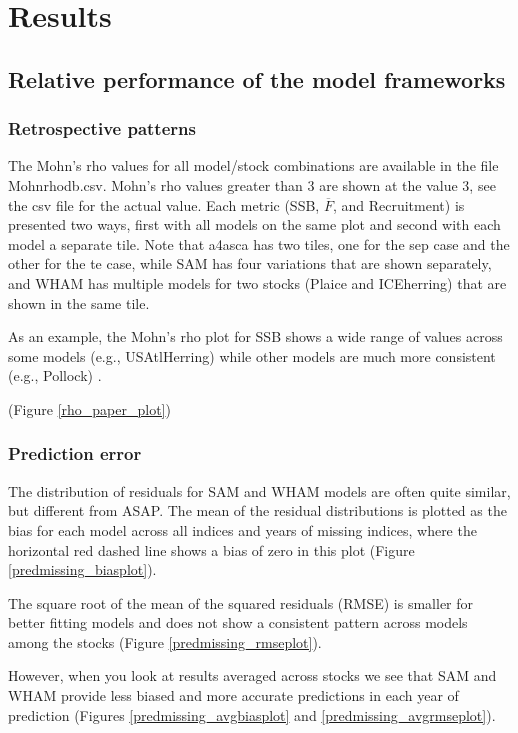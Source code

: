 \documentclass[12pt,letterpaper, leqno]{article}
\begin{document}
\section*{Results}

\subsection*{Relative performance of the model frameworks}

\subsubsection*{Retrospective patterns}

The Mohn's rho values for all model/stock combinations are available in the file Mohnrhodb.csv. Mohn's rho values greater than 3 are shown at the value 3, see the csv file for the actual value. Each metric (SSB, $\overline F$, and Recruitment) is presented two ways, first with all models on the same plot and second with each model a separate tile. Note that a4asca has two tiles, one for the sep case and the other for the te case, while SAM has four variations that are shown separately, and WHAM has multiple models for two stocks (Plaice and ICEherring) that are shown in the same tile.


As an example, the Mohn's rho plot for SSB shows a wide range of values across some models (e.g., USAtlHerring) while other models are much more consistent (e.g., Pollock) . 

(Figure \ref{rho_paper_plot})

\subsubsection*{Prediction error}

The distribution of residuals for SAM and WHAM models are often quite similar, but different from ASAP. The mean of the residual distributions is plotted as the bias for each model across all indices and years of missing indices, where the horizontal red dashed line shows a bias of zero in this plot (Figure \ref{predmissing_biasplot}).


The square root of the mean of the squared residuals (RMSE) is smaller for better fitting models and does not show a consistent pattern across models among the stocks (Figure \ref{predmissing_rmseplot}).

However, when you look at results averaged across stocks we see that SAM and WHAM provide less biased and more accurate predictions in each year of prediction (Figures \ref{predmissing_avgbiasplot} and \ref{predmissing_avgrmseplot}).
\end{document}
